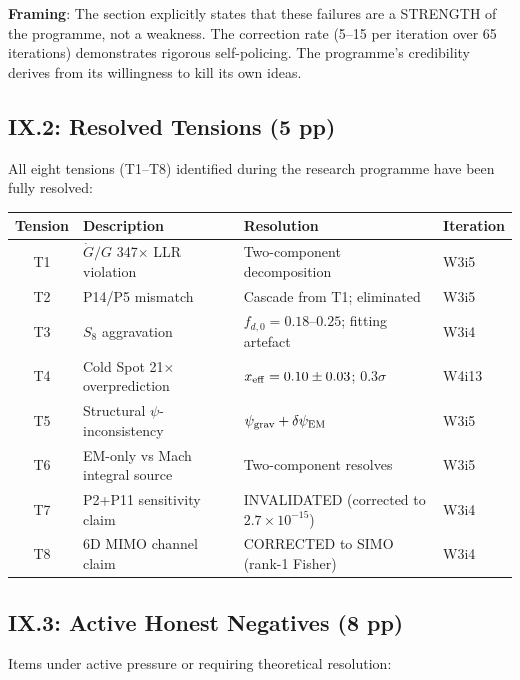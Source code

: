 \documentclass[11pt,a4paper]{article}
\begin{document}
\textbf{Framing}: The section explicitly states that these failures are a STRENGTH of the programme, not a weakness. The correction rate (5--15 per iteration over 65 iterations) demonstrates rigorous self-policing. The programme's credibility derives from its willingness to kill its own ideas.

\subsection{IX.2: Resolved Tensions (5 pp)}

All eight tensions (T1--T8) identified during the research programme have been fully resolved:

\begin{center}
\begin{longtable}{clll}
\toprule
\textbf{Tension} & \textbf{Description} & \textbf{Resolution} & \textbf{Iteration} \\
\midrule
T1 & $\dot{G}/G$ 347$\times$ LLR violation & Two-component decomposition & W3i5 \\
T2 & P14/P5 mismatch & Cascade from T1; eliminated & W3i5 \\
T3 & $S_8$ aggravation & $f_{d,0} = 0.18$--$0.25$; fitting artefact & W3i4 \\
T4 & Cold Spot 21$\times$ overprediction & $x_{\rm eff} = 0.10 \pm 0.03$; 0.3$\sigma$ & W4i13 \\
T5 & Structural $\psi$-inconsistency & $\psi_{\rm grav} + \delta\psi_{\rm EM}$ & W3i5 \\
T6 & EM-only vs Mach integral source & Two-component resolves & W3i5 \\
T7 & P2+P11 sensitivity claim & INVALIDATED (corrected to $2.7 \times 10^{-15}$) & W3i4 \\
T8 & 6D MIMO channel claim & CORRECTED to SIMO (rank-1 Fisher) & W3i4 \\
\bottomrule
\end{longtable}
\end{center}

\subsection{IX.3: Active Honest Negatives (8 pp)}

Items under active pressure or requiring theoretical resolution:
\end{document}

